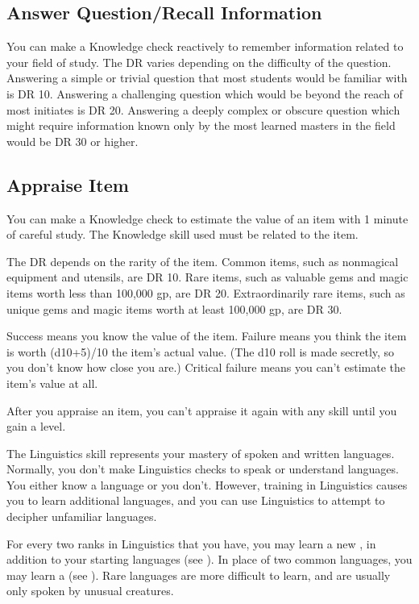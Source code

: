     \subsection{Answer Question/Recall Information}
        You can make a Knowledge check reactively to remember information related to your field of study. The DR varies depending on the difficulty of the question. Answering a simple or trivial question that most students would be familiar with is DR 10. Answering a challenging question which would be beyond the reach of most initiates is DR 20. Answering a deeply complex or obscure question which might require information known only by the most learned masters in the field would be DR 30 or higher.

    \subsection{Appraise Item}
        You can make a Knowledge check to estimate the value of an item with 1 minute of careful study. The Knowledge skill used must be related to the item.

        The DR depends on the rarity of the item. Common items, such as nonmagical equipment and utensils, are DR 10. Rare items, such as valuable gems and magic items worth less than 100,000 gp, are DR 20. Extraordinarily rare items, such as unique gems and magic items worth at least 100,000 gp, are DR 30.

        Success means you know the value of the item. Failure means you think the item is worth (d10+5)/10 \x the item's actual value. (The d10 roll is made secretly, so you don't know how close you are.) Critical failure means you can't estimate the item's value at all.

        After you appraise an item, you can't appraise it again with any skill until you gain a level.

        The Linguistics skill represents your mastery of spoken and written languages.
        Normally, you don't make Linguistics checks to speak or understand languages.
        You either know a language or you don't.
        However, training in Linguistics causes you to learn additional languages, and you can use Linguistics to attempt to decipher unfamiliar languages.

        \label{Learning Languages}
        For every two ranks in Linguistics that you have, you may learn a new , in addition to your starting languages (see ). In place of two common languages, you may learn a  (see ). Rare languages are more difficult to learn, and are usually only spoken by unusual creatures.

